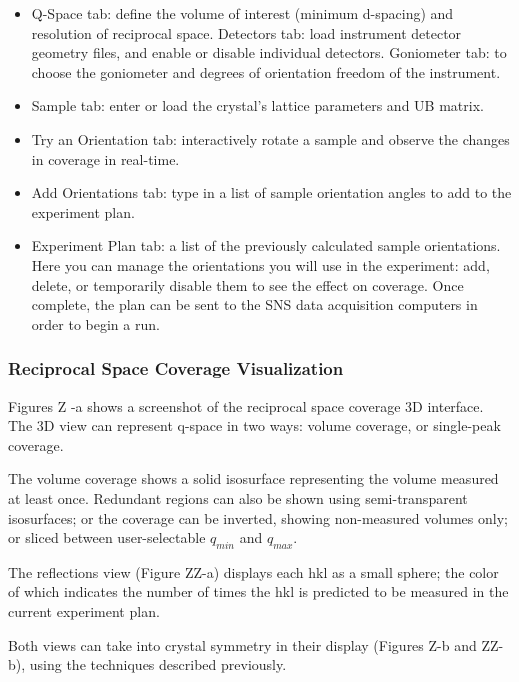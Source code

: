 \documentclass{iucr}              %
\begin{document}
\begin{itemize}
  \item Q-Space tab: define the volume of interest (minimum d-spacing) and
resolution of reciprocal space. Detectors tab: load instrument detector geometry
files, and enable or disable individual detectors. Goniometer tab: to choose the
goniometer and degrees of orientation freedom of the instrument.
   
  \item Sample tab: enter or load the crystal's lattice parameters and UB matrix.

  \item Try an Orientation tab: interactively rotate a sample and observe the
  changes in coverage in real-time.
   
  \item Add Orientations tab: type in a list of sample orientation angles to add
  to the experiment plan.
 
  \item Experiment Plan tab: a list of the previously calculated sample orientations.
Here you can manage the orientations you will use in the experiment: add,
delete, or temporarily disable them to see the effect on coverage. Once
complete, the plan can be sent to the SNS data acquisition computers in order to
begin a run.
    
\end{itemize} 



\subsubsection{Reciprocal Space Coverage Visualization}
Figures Z -a shows a screenshot of the reciprocal space coverage 3D interface.
The 3D view can represent q-space in two ways: volume coverage, or single-peak
coverage.  

The volume coverage shows a solid isosurface representing the volume measured at
least once. Redundant regions can also be shown using semi-transparent
isosurfaces; or the coverage can be inverted, showing non-measured volumes only;
or sliced between user-selectable $q_{min}$ and $q_{max}$.        

The reflections view (Figure ZZ-a) displays each hkl as a small sphere; the
color of which indicates the number of times the hkl is predicted to be measured
in the current experiment plan.       

Both views can take into crystal symmetry in their display (Figures Z-b and
ZZ-b), using the techniques described previously.   
 
\end{document}
